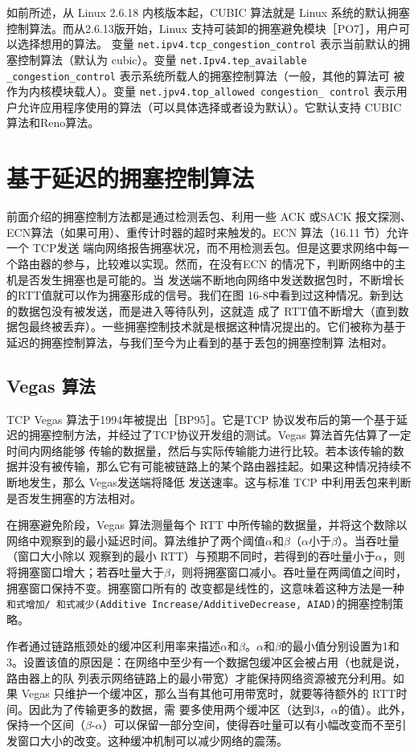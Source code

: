 如前所述，从 Linux 2.6.18 内核版本起，CUBIC 算法就是 Linux 系统的默认拥塞控制算法。而从2.6.13版开始，Linux 支持可装卸的拥塞避免模块［PO7］，用户可以选择想用的算法。
变量 \verb|net.ipv4.tcp_congestion_control| 表示当前默认的拥塞控制算法（默认为 cubic）。变量 \verb|net.Ipv4.tep_available _congestion_control| 表示系统所载人的拥塞控制算法（一般，其他的算法可
被作为内核模块载人）。变量 \verb|net.jpv4.top_allowed congestion_ control| 表示用户允许应用程序使用的算法（可以具体选择或者设为默认）。它默认支持 CUBIC 算法和Reno算法。

\section{基于延迟的拥塞控制算法}
前面介绍的拥塞控制方法都是通过检测丢包、利用一些 ACK 或SACK 报文探测、ECN算法（如果可用）、重传计时器的超时来触发的。ECN 算法（16.11 节）允许一个 TCP发送
端向网络报告拥塞状况，而不用检测丢包。但是这要求网络中每一个路由器的参与，比较难以实现。然而，在没有ECN 的情况下，判断网络中的主机是否发生拥塞也是可能的。当
发送端不断地向网络中发送数据包时，不断增长的RTT值就可以作为拥塞形成的信号。我们在图 16-8中看到过这种情况。新到达的数据包没有被发送，而是进入等待队列，这就造
成了 RTT值不断增大（直到数据包最终被丢弃）。一些拥塞控制技术就是根据这种情况提出的。它们被称为基于延迟的拥塞控制算法，与我们至今为止看到的基于丢包的拥塞控制算
法相对。

\subsection{Vegas 算法}
TCP Vegas 算法于1994年被提出［BP95］。它是TCP 协议发布后的第一个基于延迟的拥塞控制方法，并经过了TCP协议开发组的测试。Vegas 算法首先估算了一定时间内网络能够
传输的数据量，然后与实际传输能力进行比较。若本该传输的数据并没有被传输，那么它有可能被链路上的某个路由器挂起。如果这种情况持续不断地发生，那么 Vegas发送端将降低
发送速率。这与标准 TCP 中利用丢包来判断是否发生拥塞的方法相对。

在拥塞避免阶段，Vegas 算法测量每个 RTT 中所传输的数据量，并将这个数除以网络中观察到的最小延迟时间。算法维护了两个阈值$\alpha$和$\beta$（$\alpha$小于$\beta$）。当吞吐量（窗口大小除以
观察到的最小 RTT）与预期不同时，若得到的吞吐量小于$\alpha$，则将拥塞窗口增大；若吞吐量大于$\beta$，则将拥塞窗口减小。吞吐量在两阈值之间时，拥塞窗口保持不变。拥塞窗口所有的
改变都是线性的，这意味着这种方法是一种\verb|和式增加/ 和式减少|\verb|(Additive Increase/AdditiveDecrease, AIAD)|的拥塞控制策略。

作者通过链路瓶颈处的缓冲区利用率来描述$\alpha$和$\beta$。$\alpha$和$\beta$的最小值分别设置为1和3。设置该值的原因是：在网络中至少有一个数据包缓冲区会被占用（也就是说，路由器上的队
列表示网络链路上的最小带宽）才能保持网络资源被充分利用。如果 Vegas 只维护一个缓冲区，那么当有其他可用带宽时，就要等待额外的 RTT时间。因此为了传输更多的数据，需
要多使用两个缓冲区（达到3，$\alpha$的值）。此外，保持一个区间（$\beta$-$\alpha$）可以保留一部分空间，使得吞吐量可以有小幅改变而不至引发窗口大小的改变。这种缓冲机制可以减少网络的震荡。

